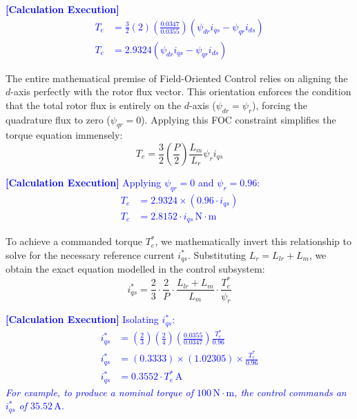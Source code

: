 \documentclass[12pt]{article}
\begin{document}
    \textcolor{blue}{\textbf{[Calculation Execution]} 
    \begin{align*}
        T_e &= \frac{3}{2} (2) \left(\frac{0.0347}{0.0355}\right) \left( \psi_{dr} i_{qs} - \psi_{qr} i_{ds} \right) \\
        T_e &= 2.9324 \left( \psi_{dr} i_{qs} - \psi_{qr} i_{ds} \right)
    \end{align*}}

The entire mathematical premise of Field-Oriented Control relies on aligning the $d$-axis perfectly with the rotor flux vector. This orientation enforces the condition that the total rotor flux is entirely on the $d$-axis ($\psi_{dr} = \psi_r$), forcing the quadrature flux to zero ($\psi_{qr} = 0$). Applying this FOC constraint simplifies the torque equation immensely:
\begin{equation}
    T_e = \frac{3}{2} \left( \frac{P}{2} \right) \frac{L_m}{L_r} \psi_r i_{qs}
\end{equation}

    \textcolor{blue}{\textbf{[Calculation Execution]} Applying $\psi_{qr} = 0$ and $\psi_r = 0.96$:
    \begin{align*}
        T_e &= 2.9324 \times (0.96 \cdot i_{qs}) \\
        T_e &= 2.8152 \cdot i_{qs} \, \text{N}\cdot\text{m}
    \end{align*}}

To achieve a commanded torque $T_e^*$, we mathematically invert this relationship to solve for the necessary reference current $i_{qs}^*$. Substituting $L_r = L_{lr} + L_m$, we obtain the exact equation modelled in the control subsystem:
\begin{equation}
    i_{qs}^* = \frac{2}{3} \cdot \frac{2}{P} \cdot \frac{L_{lr} + L_m}{L_m} \cdot \frac{T_e^*}{\psi_r}
\end{equation}

    \textcolor{blue}{\textbf{[Calculation Execution]} Isolating $i_{qs}^*$:
    \begin{align*}
        i_{qs}^* &= \left( \frac{2}{3} \right) \left( \frac{2}{4} \right) \left( \frac{0.0355}{0.0347} \right) \frac{T_e^*}{0.96} \\
        i_{qs}^* &= (0.3333) \times (1.02305) \times \frac{T_e^*}{0.96} \\
        i_{qs}^* &= 0.3552 \cdot T_e^* \, \text{A}
    \end{align*}
    \textit{For example, to produce a nominal torque of $100 \, \text{N}\cdot\text{m}$, the control commands an $i_{qs}^*$ of $35.52 \, \text{A}$.}}
\end{document}
